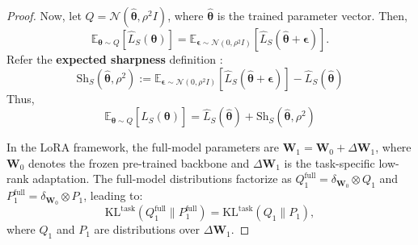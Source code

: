 \documentclass[letterpaper]{article} %
\begin{document}
\begin{proof}


Now, let $Q = \mathcal{N}(\hat{\boldsymbol{\theta}}, \rho^2 I)$, where $\hat{\boldsymbol{\theta}}$ is the trained parameter vector. Then,
$$\mathbb{E}_{\boldsymbol{\theta} \sim Q}[\hat{L}_S(\boldsymbol{\theta})] = \mathbb{E}_{\boldsymbol{\epsilon} \sim \mathcal{N}(0, \rho^2 I)}[\hat{L}_S(\hat{\boldsymbol{\theta}} + \boldsymbol{\epsilon})].$$
Refer the \textbf{expected sharpness} definition :
$$\mathrm{Sh}_S(\hat{\boldsymbol{\theta}}, \rho^2) := \mathbb{E}_{\boldsymbol{\epsilon} \sim \mathcal{N}(0, \rho^2 I)}\left[ \hat{L}_S(\hat{\boldsymbol{\theta}} + \boldsymbol{\epsilon}) \right] - \hat{L}_S(\hat{\boldsymbol{\theta}})$$
Thus,
$$\mathbb{E}_{\boldsymbol{\theta} \sim Q}[\hat{L}_S(\boldsymbol{\theta})] = \hat{L}_S(\hat{\boldsymbol{\theta}}) + \mathrm{Sh}_S(\hat{\boldsymbol{\theta}}, \rho^2)$$

In the LoRA framework, the full-model parameters are $\boldsymbol{W}_1 = \boldsymbol{W}_0 + \Delta\boldsymbol{W}_1$, where $\boldsymbol{W}_0$ denotes the frozen pre-trained backbone and $\Delta\boldsymbol{W}_1$ is the task-specific low-rank adaptation. The full-model distributions factorize as $Q_1^{\text{full}} = \delta_{\boldsymbol{W}_0} \otimes Q_1$ and $P_1^{\text{full}} = \delta_{\boldsymbol{W}_0} \otimes P_1$, leading to:
\begin{equation}
    \text{KL}^{\text{task}}(Q_1^{\text{full}} \| P_1^{\text{full}}) = \text{KL}^{\text{task}}(Q_1 \| P_1),
\end{equation}
where $Q_1$ and $P_1$ are distributions over $\Delta\boldsymbol{W}_1$. 



\end{proof}
\end{document}
